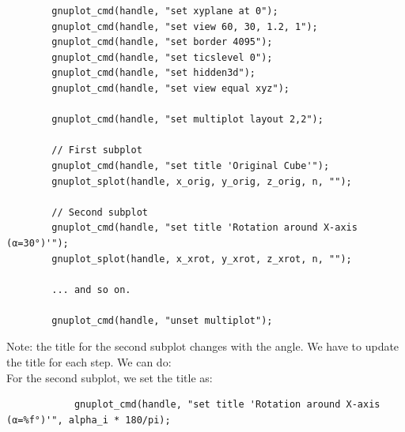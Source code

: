 
\begin{verbatim}
        gnuplot_cmd(handle, "set xyplane at 0");
        gnuplot_cmd(handle, "set view 60, 30, 1.2, 1");
        gnuplot_cmd(handle, "set border 4095");
        gnuplot_cmd(handle, "set ticslevel 0");
        gnuplot_cmd(handle, "set hidden3d");
        gnuplot_cmd(handle, "set view equal xyz");

        gnuplot_cmd(handle, "set multiplot layout 2,2");

        // First subplot
        gnuplot_cmd(handle, "set title 'Original Cube'");
        gnuplot_splot(handle, x_orig, y_orig, z_orig, n, "");

        // Second subplot
        gnuplot_cmd(handle, "set title 'Rotation around X-axis (α=30°)'");
        gnuplot_splot(handle, x_xrot, y_xrot, z_xrot, n, "");

        ... and so on.

        gnuplot_cmd(handle, "unset multiplot");
\end{verbatim}

Note: the title for the second subplot changes with the angle. We have to update the title for each step.
We can do:\\
For the second subplot, we set the title as:

\begin{verbatim}
            gnuplot_cmd(handle, "set title 'Rotation around X-axis (α=%f°)'", alpha_i * 180/pi);
\end{verbatim}
